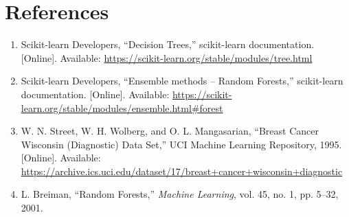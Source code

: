\documentclass[12pt,a4paper]{article}
\begin{document}
\section{References}
\begin{enumerate}
\item Scikit-learn Developers, ``Decision Trees,'' scikit-learn documentation. [Online]. Available: \url{https://scikit-learn.org/stable/modules/tree.html}
\item Scikit-learn Developers, ``Ensemble methods -- Random Forests,'' scikit-learn documentation. [Online]. Available: \url{https://scikit-learn.org/stable/modules/ensemble.html#forest}
\item W. N. Street, W. H. Wolberg, and O. L. Mangasarian, ``Breast Cancer Wisconsin (Diagnostic) Data Set,'' UCI Machine Learning Repository, 1995. [Online]. Available: \url{https://archive.ics.uci.edu/dataset/17/breast+cancer+wisconsin+diagnostic}
\item L. Breiman, ``Random Forests,'' \emph{Machine Learning}, vol. 45, no. 1, pp. 5--32, 2001.
\end{enumerate}
\end{document}
